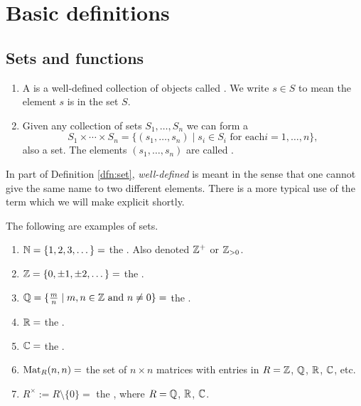 \documentclass[../algebraNotesMSRI-UP2016.tex]{subfiles}
\begin{document}
\section[\S \thesection]{Basic definitions}\label{sec:2p1basicDefinitions}
\subsection[\subsecname]{Sets and functions}\label{subsec:setsAndFunctions}
\begin{frame}{\subsecname}{}
\begin{dfn}\label{dfn:set}
\begin{enumerate}
\item\label{dfnpt:set} 
A  is a well-defined collection of objects called .  We write $s\in S$ to mean the element $s$ is in the set $S$.
\item Given any collection of sets $S_1,\dots,S_n$ we can form a  
\[
S_1\times\cdots\times S_n=\{(s_1,\dots,s_n)\mid s_i\in S_i\text{ for each} i=1,\dots,n\},
\]
also a set.  The elements $(s_1,\dots,s_n)$ are called .
\end{enumerate}
\end{dfn}

\smallGap
In part  of Definition \ref{dfn:set}, \emph{well-defined} is meant in the sense that one cannot give the same name to two different elements.  There is a more typical use of the term which we will make explicit shortly.
\end{frame}

\begin{frame}{}{}
\begin{ex}\label{ex:sets}
The following are examples of sets.
\begin{enumerate}
\item $\mathbb N=\{1,2,3,\dots\}=$ the .  Also denoted $\mathbb Z^+$ or $\mathbb Z_{>0}$.
\item $\mathbb Z=\{0,\pm 1, \pm 2,\dots\}=$ the .
\item $\mathbb Q=\{\frac{m}{n}\mid m,n\in \mathbb Z\text{ and }n\neq 0\}=$ the .
\item $\mathbb R=$ the .
\item $\mathbb C=$ the .
\item $\operatorname{Mat}_{R}(n,n)=$ the set of $n\times n$ matrices with entries in $R=\mathbb Z$, $\mathbb Q$, $\mathbb R$, $\mathbb C$, etc.
\item $R^{\times}:=R\setminus\{0\}=$ the , where $R=\mathbb Q$, $\mathbb R$, $\mathbb C$.
\end{enumerate}
\end{ex}
\end{frame}
\end{document}
